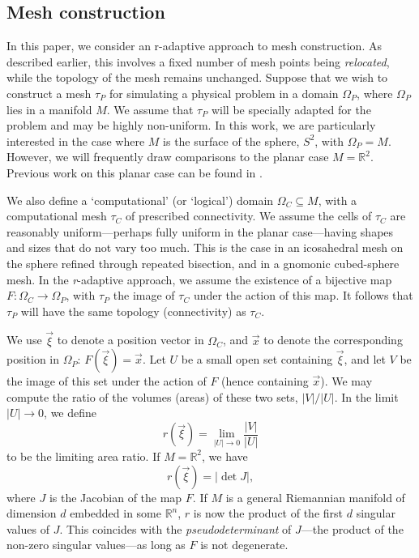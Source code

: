 \documentclass[11pt, a4paper]{scrartcl}  %
\theoremstyle{plain}
\theoremstyle{definition}
\numberwithin{equation}{section}
\begin{document}
\subsection{Mesh construction}
In this paper, we consider an r-adaptive approach to mesh construction.
As described earlier, this involves a fixed number of mesh points being
\emph{relocated}, while the topology of the mesh remains unchanged.
Suppose that we wish to construct a mesh $\tau_P$ for simulating a
physical problem in a domain $\Omega_P$, where $\Omega_P$ lies in a
manifold $M$. We assume that $\tau_P$ will be specially adapted for the
problem and may be highly non-uniform. In this work, we are particularly
interested in the case where $M$ is the surface of the sphere, $S^2$,
with $\Omega_P = M$. However, we will frequently draw comparisons to the
planar case $M = \mathbb{R}^2$. Previous work on this planar case can be
found in \citet{budd2015geometry}.

We also define a `computational' (or `logical') domain
$\Omega_C \subseteq M$, with a computational mesh $\tau_C$ of prescribed
connectivity. We assume the cells of $\tau_C$ are reasonably
uniform---perhaps fully uniform in the planar case---having
shapes and sizes that do not vary too much. This is the case in an
icosahedral mesh on the sphere refined through repeated bisection, and
in a gnomonic cubed-sphere mesh. In the \emph{r}-adaptive approach, we
assume the existence of a bijective map $F: \Omega_C \to \Omega_P$, with
$\tau_P$ the image of $\tau_C$ under the action of this map. It follows
that $\tau_P$ will have the same topology (connectivity) as $\tau_C$.

We use $\vec{\xi}$ to denote a position vector in $\Omega_C$, and
$\vec{x}$ to denote the corresponding position in $\Omega_P$:
$F(\vec{\xi}) = \vec{x}$. Let $U$ be a small open set containing
$\vec{\xi}$, and let $V$ be the image of this set under the action of
$F$ (hence containing $\vec{x}$). We may compute the ratio of the
volumes (areas) of these two sets, $|V|/|U|$. In the limit $|U| \to 0$,
we define
\begin{equation}
  \label{eq:UVratio}
  r(\vec{\xi}) = \lim_{|U| \to 0} \frac{|V|}{|U|}
\end{equation}
to be the limiting area ratio. If $M = \mathbb{R}^2$, we have
\begin{equation}
  r(\vec{\xi}) = |\det J|,
\end{equation}
where $J$ is the Jacobian of the map $F$. If $M$ is a general Riemannian
manifold of dimension $d$ embedded in some $\mathbb{R}^n$, $r$ is now
the product of the first $d$ singular values of $J$. This coincides with
the \emph{pseudodeterminant} of $J$---the product of the non-zero
singular values---as long as $F$ is not degenerate.
\end{document}
